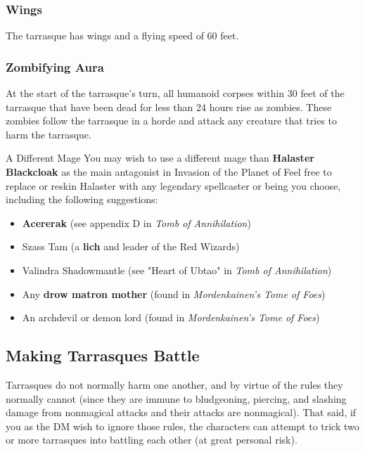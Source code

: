 \documentclass[10pt,a4paper,twoside,bg=print,twocolumn,openany,nodeprecatedcode]{dndbook}
\begin{document}
\subsubsection{Wings}
The tarrasque has wings and a flying speed of 60 feet.

\subsubsection{Zombifying Aura}
At the start of the tarrasque's turn, all humanoid corpses within 30 feet of the tarrasque that have been dead for less than 24 hours rise as zombies. These zombies follow the tarrasque in a horde and attack any creature that tries to harm the tarrasque.

\begin{DndSidebar}[float=!b]{A Different Mage}
You may wish to use a different mage than \textbf{Halaster Blackcloak} as the main antagonist in Invasion of the Planet of Feel free to replace or reskin Halaster with any legendary spellcaster or being you choose, including the following suggestions:




\begin{itemize}
\item \textbf{Acererak} (see appendix D in \textit{Tomb of Annihilation})
\item Szass Tam (a \textbf{lich} and leader of the Red Wizards)
\item Valindra Shadowmantle (see "Heart of Ubtao" in \textit{Tomb of  Annihilation})
\item Any \textbf{drow matron mother} (found in \textit{Mordenkainen's Tome  of Foes})
\item An archdevil or demon lord (found in \textit{Mordenkainen's Tome of Foes})
\end{itemize}



\end{DndSidebar}

\subsection{Making Tarrasques Battle}
Tarrasques do not normally harm one another, and by virtue of the rules they normally cannot (since  they are immune to bludgeoning, piercing, and  slashing damage from nonmagical attacks and their  attacks are nonmagical). That said, if you as the DM wish to ignore those rules, the characters can attempt to trick two or more tarrasques into battling each other (at great personal risk).
\end{document}

